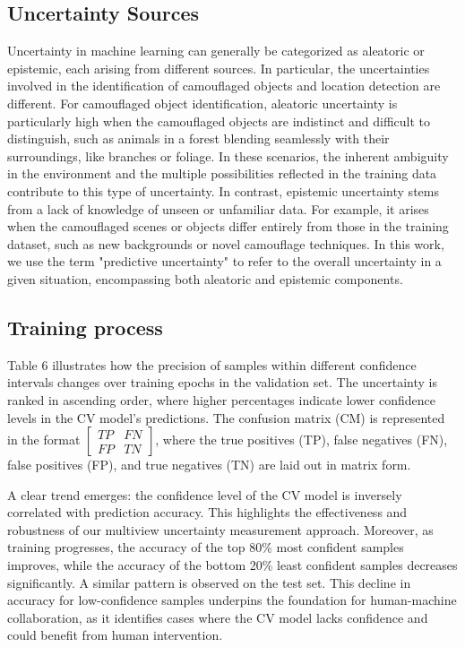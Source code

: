\documentclass[preprint,12pt,authoryear]{elsarticle}
\begin{document}
\subsection{Uncertainty Sources}
Uncertainty in machine learning can generally be categorized as aleatoric or epistemic, each arising from different sources. In particular, the uncertainties involved in the identification of camouflaged objects and location detection are different. For camouflaged object identification, aleatoric uncertainty is particularly high when the camouflaged objects are indistinct and difficult to distinguish, such as animals in a forest blending seamlessly with their surroundings, like branches or foliage. In these scenarios, the inherent ambiguity in the environment and the multiple possibilities reflected in the training data contribute to this type of uncertainty. In contrast, epistemic uncertainty stems from a lack of knowledge of unseen or unfamiliar data. For example, it arises when the camouflaged scenes or objects differ entirely from those in the training dataset, such as new backgrounds or novel camouflage techniques. In this work, we use the term "predictive uncertainty" to refer to the overall uncertainty in a given situation, encompassing both aleatoric and epistemic components.

\subsection{Training process}
Table 6 illustrates how the precision of samples within different confidence intervals changes over training epochs in the validation set. The uncertainty is ranked in ascending order, where higher percentages indicate lower confidence levels in the CV model's predictions. The confusion matrix (CM) is represented in the format
$\begin{bmatrix}
TP & FN \\ 
FP & TN 
\end{bmatrix}$, where the true positives (TP), false negatives (FN), false positives (FP), and true negatives (TN) are laid out in matrix form.

A clear trend emerges: the confidence level of the CV model is inversely correlated with prediction accuracy. This highlights the effectiveness and robustness of our multiview uncertainty measurement approach. Moreover, as training progresses, the accuracy of the top 80\% most confident samples improves, while the accuracy of the bottom 20\% least confident samples decreases significantly. A similar pattern is observed on the test set. This decline in accuracy for low-confidence samples underpins the foundation for human-machine collaboration, as it identifies cases where the CV model lacks confidence and could benefit from human intervention.
\end{document}
